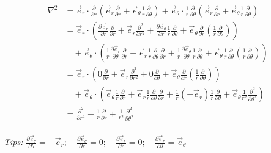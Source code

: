 	\[ \begin{aligned}
	\nabla ^2 &= \vec{e}_r \cdot\frac{\partial }{\partial r}  (\vec{e}_r \frac{\partial }{\partial r} +   \vec{e}_\theta \frac{1}{r} \frac{\partial }{\partial \theta})+  \vec{e}_\theta \cdot \frac{1}{r} \frac{\partial }{\partial \theta} (\vec{e}_r \frac{\partial }{\partial r} +   \vec{e}_\theta \frac{1}{r} \frac{\partial }{\partial \theta})\\
	&=\vec{e}_r \cdot (\frac{\partial \vec{e}_r}{\partial r} \frac{\partial }{\partial r} + \vec{e}_r \frac{\partial ^2 }{\partial r ^2}+  \frac{\partial \vec{e}_\theta}{\partial r} \frac{1}{r}\frac{\partial }{\partial \theta}+  \vec{e}_\theta\frac{\partial }{\partial r} (\frac{1}{r}\frac{\partial }{\partial \theta})) \\
	&\hspace{1em} + \vec{e}_\theta \cdot (\frac{1}{r}\frac{\partial \vec{e}_r}{\partial \theta} \frac{\partial }{\partial r} + \vec{e}_r \frac{1}{r} \frac{\partial }{\partial \theta} \frac{\partial }{\partial r} + \frac{1}{r} \frac{\partial  \vec{e}_\theta}{\partial \theta} \frac{1}{r} \frac{\partial }{\partial \theta} + \vec{e}_\theta \frac{1}{r} \frac{\partial }{\partial \theta} (\frac{1}{r} \frac{\partial }{\partial \theta} )
	) \\
	&=\vec{e}_r \cdot (0 \frac{\partial }{\partial r} + \vec{e}_r \frac{\partial ^2 }{\partial r ^2}+  0\frac{\partial }{\partial \theta}+  \vec{e}_\theta\frac{\partial }{\partial r} (\frac{1}{r}\frac{\partial }{\partial \theta})) \\
	&\hspace{1em} + \vec{e}_\theta \cdot (\vec{e}_\theta \frac{1}{r}\frac{\partial }{\partial r} + \vec{e}_r \frac{1}{r} \frac{\partial }{\partial \theta} \frac{\partial }{\partial r} + \frac{1}{r} (-\vec{e}_r) \frac{1}{r} \frac{\partial }{\partial \theta} + \vec{e}_\theta \frac{1}{r^2} \frac{\partial ^2 }{\partial \theta ^2}
	) \\
	&=  \frac{\partial^2  }{\partial r^2 } +\frac{1}{r } \frac{\partial  }{\partial r } +\frac{1}{r^2 } \frac{\partial ^2  }{\partial \theta ^2} 
	\end{aligned}\] 
~\\ \vspace{1em}
{\alert{\textit{Tips:\hspace{1em}}}} $\frac{\partial  \vec{e}_\theta}{\partial \theta}=-\vec{e}_r ;\quad \frac{\partial  \vec{e}_\theta}{\partial r}=0 ;  \quad \frac{\partial  \vec{e}_r}{\partial r}=0 ; \quad\frac{\partial  \vec{e}_r}{\partial \theta}=\vec{e}_\theta $ 




